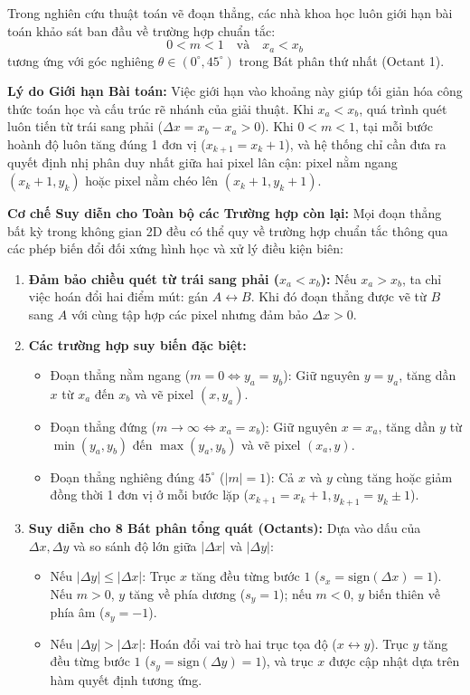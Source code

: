 Trong nghiên cứu thuật toán vẽ đoạn thẳng, các nhà khoa học luôn giới hạn bài toán khảo sát ban đầu về trường hợp chuẩn tắc:
\begin{equation}
0 < m < 1 \quad \text{và} \quad x_a < x_b
\end{equation}
tương ứng với góc nghiêng $\theta \in (0^\circ, 45^\circ)$ trong Bát phân thứ nhất (Octant 1).

\textbf{Lý do Giới hạn Bài toán:}
Việc giới hạn vào khoảng này giúp tối giản hóa công thức toán học và cấu trúc rẽ nhánh của giải thuật. Khi $x_a < x_b$, quá trình quét luôn tiến từ trái sang phải ($\Delta x = x_b - x_a > 0$). Khi $0 < m < 1$, tại mỗi bước hoành độ luôn tăng đúng 1 đơn vị ($x_{k+1} = x_k + 1$), và hệ thống chỉ cần đưa ra quyết định nhị phân duy nhất giữa hai pixel lân cận: pixel nằm ngang $(x_k + 1, y_k)$ hoặc pixel nằm chéo lên $(x_k + 1, y_k + 1)$.

\textbf{Cơ chế Suy diễn cho Toàn bộ các Trường hợp còn lại:}
Mọi đoạn thẳng bất kỳ trong không gian 2D đều có thể quy về trường hợp chuẩn tắc thông qua các phép biến đổi đối xứng hình học và xử lý điều kiện biên:

\begin{enumerate}
    \item \textbf{Đảm bảo chiều quét từ trái sang phải ($x_a < x_b$):} Nếu $x_a > x_b$, ta chỉ việc hoán đổi hai điểm mút: gán $A \leftrightarrow B$. Khi đó đoạn thẳng được vẽ từ $B$ sang $A$ với cùng tập hợp các pixel nhưng đảm bảo $\Delta x > 0$.
    \item \textbf{Các trường hợp suy biến đặc biệt:}
    \begin{itemize}
        \item Đoạn thẳng nằm ngang ($m = 0 \iff y_a = y_b$): Giữ nguyên $y = y_a$, tăng dần $x$ từ $x_a$ đến $x_b$ và vẽ pixel $(x, y_a)$.
        \item Đoạn thẳng đứng ($m \to \infty \iff x_a = x_b$): Giữ nguyên $x = x_a$, tăng dần $y$ từ $\min(y_a, y_b)$ đến $\max(y_a, y_b)$ và vẽ pixel $(x_a, y)$.
        \item Đoạn thẳng nghiêng đúng $45^\circ$ ($|m| = 1$): Cả $x$ và $y$ cùng tăng hoặc giảm đồng thời 1 đơn vị ở mỗi bước lặp ($x_{k+1} = x_k + 1, y_{k+1} = y_k \pm 1$).
    \end{itemize}
    \item \textbf{Suy diễn cho 8 Bát phân tổng quát (Octants):}
    Dựa vào dấu của $\Delta x, \Delta y$ và so sánh độ lớn giữa $|\Delta x|$ và $|\Delta y|$:
    \begin{itemize}
        \item Nếu $|\Delta y| \le |\Delta x|$: Trục $x$ tăng đều từng bước $1$ ($s_x = \text{sign}(\Delta x) = 1$). Nếu $m > 0$, $y$ tăng về phía dương ($s_y = 1$); nếu $m < 0$, $y$ biến thiên về phía âm ($s_y = -1$).
        \item Nếu $|\Delta y| > |\Delta x|$: Hoán đổi vai trò hai trục tọa độ ($x \leftrightarrow y$). Trục $y$ tăng đều từng bước $1$ ($s_y = \text{sign}(\Delta y) = 1$), và trục $x$ được cập nhật dựa trên hàm quyết định tương ứng.
    \end{itemize}
\end{enumerate}

